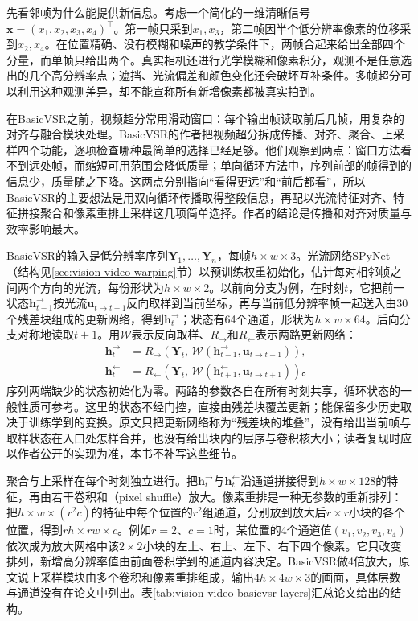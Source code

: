 先看邻帧为什么能提供新信息。考虑一个简化的一维清晰信号$\bm{x}=(x_1,x_2,x_3,x_4)^\top$。第一帧只采到$x_1,x_3$，第二帧因半个低分辨率像素的位移采到$x_2,x_4$。在位置精确、没有模糊和噪声的教学条件下，两帧合起来给出全部四个分量，而单帧只给出两个。真实相机还进行光学模糊和像素积分，观测不是任意选出的几个高分辨率点；遮挡、光流偏差和颜色变化还会破坏互补条件。多帧超分可以利用这种观测差异，却不能宣称所有新增像素都被真实拍到。

在BasicVSR之前，视频超分常用滑动窗口：每个输出帧读取前后几帧，用复杂的对齐与融合模块处理。BasicVSR的作者把视频超分拆成传播、对齐、聚合、上采样四个功能，逐项检查哪种最简单的选择已经足够。他们观察到两点：窗口方法看不到远处帧，而缩短可用范围会降低质量；单向循环方法中，序列前部的帧得到的信息少，质量随之下降。这两点分别指向“看得更远”和“前后都看”，所以BasicVSR的主要想法是用双向循环传播取得整段信息，再配以光流特征对齐、特征拼接聚合和像素重排上采样这几项简单选择。作者的结论是传播和对齐对质量与效率影响最大。

BasicVSR的输入是低分辨率序列$\bm{Y}_1,\dots,\bm{Y}_n$，每帧$h\times w\times3$。光流网络SPyNet（结构见\ref{sec:vision-video-warping}节）以预训练权重初始化，估计每对相邻帧之间两个方向的光流，每份形状为$h\times w\times2$。以前向分支为例，在时刻$t$，它把前一状态$\bm{h}^{\to}_{t-1}$按光流$\bm{u}_{t\to t-1}$反向取样到当前坐标，再与当前低分辨率帧一起送入由30个残差块组成的更新网络，得到$\bm{h}^{\to}_t$；状态有64个通道，形状为$h\times w\times64$。后向分支对称地读取$t+1$。用$\mathcal{W}$表示反向取样、$R_{\to}$和$R_{\leftarrow}$表示两路更新网络：
\begin{equation}
  \begin{aligned}
    \bm{h}^{\to}_t&=
      R_{\to}\!\left(\bm{Y}_t,\,
      \mathcal{W}(\bm{h}^{\to}_{t-1},\bm{u}_{t\to t-1})\right),\\
    \bm{h}^{\leftarrow}_t&=
      R_{\leftarrow}\!\left(\bm{Y}_t,\,
      \mathcal{W}(\bm{h}^{\leftarrow}_{t+1},\bm{u}_{t\to t+1})\right)\text{。}
  \end{aligned}
  \label{eq:vision-video-basicvsr}
\end{equation}
序列两端缺少的状态初始化为零。两路的参数各自在所有时刻共享，循环状态的一般性质可参考。这里的状态不经门控，直接由残差块覆盖更新；能保留多少历史取决于训练学到的变换。原文只把更新网络称为“残差块的堆叠”，没有给出当前帧与取样状态在入口处怎样合并，也没有给出块内的层序与卷积核大小；读者复现时应以作者公开的实现为准，本书不补写这些细节。

聚合与上采样在每个时刻独立进行。把$\bm{h}^{\to}_t$与$\bm{h}^{\leftarrow}_t$沿通道拼接得到$h\times w\times128$的特征，再由若干卷积和（pixel shuffle）放大。像素重排是一种无参数的重新排列：把$h\times w\times(r^2c)$的特征中每个位置的$r^2$组通道，分别放到放大后$r\times r$小块的各个位置，得到$rh\times rw\times c$。例如$r=2$、$c=1$时，某位置的4个通道值$(v_1,v_2,v_3,v_4)$依次成为放大网格中该$2\times2$小块的左上、右上、左下、右下四个像素。它只改变排列，新增高分辨率值由前面卷积学到的通道内容决定。BasicVSR做4倍放大，原文说上采样模块由多个卷积和像素重排组成，输出$4h\times4w\times3$的画面，具体层数与通道没有在论文中列出。表\ref{tab:vision-video-basicvsr-layers}汇总论文给出的结构。


